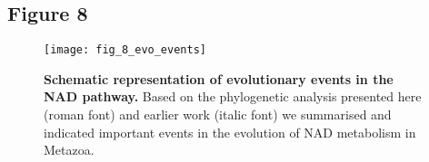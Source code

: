 \newpage


\subsection*{Figure 8}

\begin{figure}[ht]
  \centering
  \texttt{[image: fig\_8\_evo\_events]}
  \caption{\textbf{Schematic representation of evolutionary events in the NAD pathway.} Based on the phylogenetic analysis presented here (roman font) and earlier work \cite{Lau2010} (italic font) we summarised and indicated important events in the evolution of NAD metabolism in Metazoa.}
  \label{fig:evo_events}
\end{figure}
